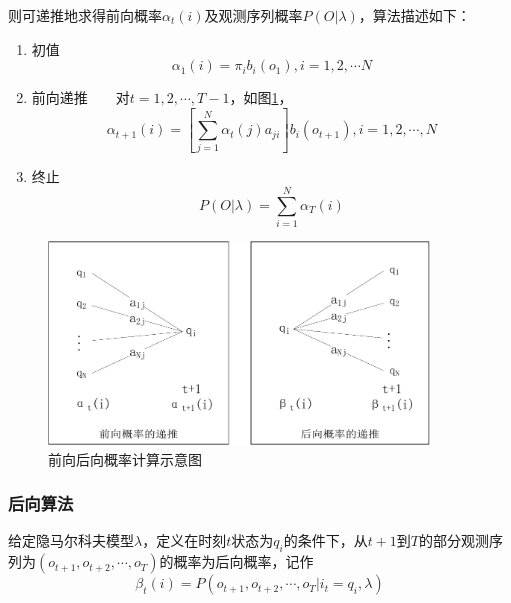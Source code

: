         则可递推地求得前向概率${\alpha _t}(i)$及观测序列概率$P(O|\lambda )$，算法描述如下：
        \begin{enumerate}
            \item 初值
                \begin{equation}
                    {\alpha _1}(i) = {\pi _i}{b_i}({o_1}),i = 1,2, \cdots N
                \end{equation}
            \item 前向递推~~~~对$t = 1,2, \cdots ,T - 1$，如图\ref{fig:forback}，
                \begin{equation}
                    {\alpha _{t + 1}}(i) = \left[ {\sum\limits_{j = 1}^N {{\alpha _t}(j){a_{ji}}} } \right]{b_i}({o_{t + 1}}),i = 1,2, \cdots ,N
                \end{equation}
            \item 终止
                \begin{equation}
                    P(O|\lambda ) = \sum\limits_{i = 1}^N {{\alpha _T}(i)}
                \end{equation}
        \end{enumerate}

        \begin{figure}
        \centering
        \includegraphics[width=0.9\textwidth]{figures/chapter2/forback-crop}
        \caption{前向后向概率计算示意图}
        \label{fig:forback}
        \end{figure}

        \subsubsection{后向算法}
        \begin{definition}[后向算法]
         给定隐马尔科夫模型$\lambda$，定义在时刻$t$状态为$q_i$的条件下，从$t+1$到$T$的部分观测序列为$({o_{t+1}},{o_{t+2}},\cdots,{o_T})$的概率为后向概率，记作
             \begin{equation}
                 {\beta _t}(i) = P({o_{t + 1}},{o_{t + 2}}, \cdots ,{o_T}|{i_t} = {q_i},\lambda )
             \end{equation}
        \end{definition}

